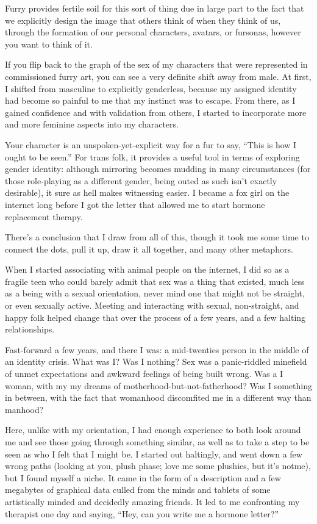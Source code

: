 Furry provides fertile soil for this sort of thing due in large part to the fact that we explicitly design the image that others think of when they think of us, through the formation of our personal characters, avatars, or fursonas, however you want to think of it.

If you flip back to the graph of the sex of my characters that were represented in commissioned furry art, you can see a very definite shift away from male. At first, I shifted from masculine to explicitly genderless, because my assigned identity had become so painful to me that my instinct was to escape. From there, as I gained confidence and with validation from others, I started to incorporate more and more feminine aspects into my characters.

Your character is an unspoken-yet-explicit way for a fur to say, ``This is how I ought to be seen.'' For trans folk, it provides a useful tool in terms of exploring gender identity: although mirroring becomes mudding in many circumstances (for those role-playing as a different gender, being outed as such isn't exactly desirable), it sure as hell makes witnessing easier. I became a fox girl on the internet long before I got the letter that allowed me to start hormone replacement therapy.

There's a conclusion that I draw from all of this, though it took me some time to connect the dots, pull it up, draw it all together, and many other metaphors.

When I started associating with animal people on the internet, I did so as a fragile teen who could barely admit that sex was a thing that existed, much less as a being with a sexual orientation, never mind one that might not be straight, or even sexually active. Meeting and interacting with sexual, non-straight, and happy folk helped change that over the process of a few years, and a few halting relationships.

Fast-forward a few years, and there I was: a mid-twenties person in the middle of an identity crisis. What was I? Was I nothing? Sex was a panic-riddled minefield of unmet expectations and awkward feelings of being built wrong. Was a I woman, with my my dreams of motherhood-but-not-fatherhood? Was I something in between, with the fact that womanhood discomfited me in a different way than manhood?

Here, unlike with my orientation, I had enough experience to both look around me and see those going through something similar, as well as to take a step to be seen as who I felt that I might be. I started out haltingly, and went down a few wrong paths (looking at you, plush phase; love me some plushies, but it's notme), but I found myself a niche. It came in the form of a description and a few megabytes of graphical data culled from the minds and tablets of some artistically minded and decidedly amazing friends. It led to me confronting my therapist one day and saying, ``Hey, can you write me a hormone letter?''


